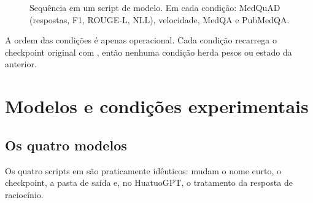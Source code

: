 \documentclass[11pt]{article}
\begin{document}
\begin{figure}[H]
\centering
{}
\caption{Sequência em um script de modelo. Em cada condição: MedQuAD (respostas, F1, ROUGE-L, NLL), velocidade, MedQA e PubMedQA.}
\end{figure}

A ordem das condições é apenas operacional. Cada condição recarrega o checkpoint original com , então nenhuma condição herda pesos ou estado da anterior.

\section{Modelos e condições experimentais}

\subsection{Os quatro modelos}

Os quatro scripts em  são praticamente idênticos: mudam o nome curto, o checkpoint, a pasta de saída e, no HuatuoGPT, o tratamento da resposta de raciocínio.
\end{document}
